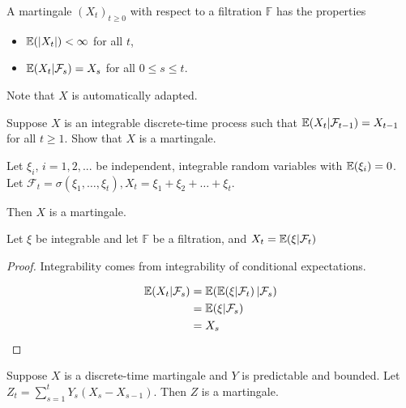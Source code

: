 \begin{defn}
  \label{defn:discrete_time_models:5}
  A martingale $(X_{t})_{t \geq 0}$ with respect to a filtration
  $\mathbb{F}$ has the properties
  \begin{itemize}
  \item $\E{|X_{t}|} < \infty$ for all $t$,
  \item $\E{X_{t} | \mathcal{F}_{s}} = X_{s}$ for all $0 \leq s \leq t$.
  \end{itemize}

  Note that $X$ is automatically adapted.
\end{defn}

\begin{exer}
  Suppose $X$ is an integrable discrete-time process such that
  $\E{X_{t}| \mathcal{F}_{t-1}} = X_{t-1}$ for all $t \geq 1$. Show
  that $X$ is a martingale.
\end{exer}

\begin{exmp}
  \label{defn:discrete_time_models:6}
  Let $\xi_{i}$, $i = 1, 2, ...$ be independent, integrable random
  variables with $\E{\xi_{i}} = 0$.  Let $\mathcal{F}_{t} =
  \sigma(\xi_{1}, \dots, \xi_{t}), X_{t} = \xi_{1} + \xi_{2} + \dots +
    \xi_{t}$.

    Then $X$ is a martingale.
\end{exmp}

\begin{exmp}
  \label{defn:discrete_time_models:7}
  Let $\xi$ be integrable and let $\mathbb{F}$ be a filtration, and
  $X_{t} = \E{\xi | \mathcal{F}_{t}}$
\end{exmp}

\begin{proof}
  Integrability comes from integrability of conditional expectations.

  \begin{align*}
    \E{X_{t} | \mathcal{F}_{s}} & = \E{\E{\xi | \mathcal{F}_{t}} |
      \mathcal{F}_{s}}                                        \\
                                & = \E{\xi | \mathcal{F}_{s}} \\ 
                                & = X_{s}
  \end{align*}
\end{proof}


\begin{exmp}
  \label{defn:discrete_time_models:8}
  Suppose $X$ is a discrete-time martingale and $Y$ is predictable and
  bounded.  Let $Z_{t} = \sum_{s=1}^{t} Y_{s} (X_{s} - X_{s-1})$. Then
  $Z$ is a martingale.
\end{exmp}

